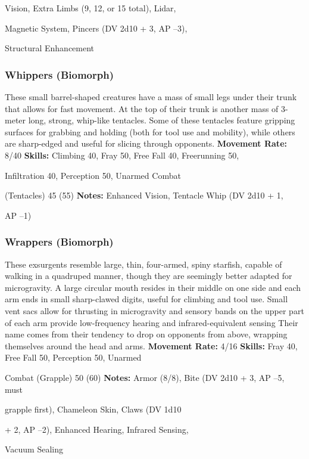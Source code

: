 Vision, Extra Limbs (9, 12, or 15 total), Lidar, 

Magnetic System, Pincers (DV 2d10 + 3, AP –3), 

Structural Enhancement 

\subsubsection{Whippers (Biomorph)}

These small barrel-shaped creatures have a mass 
of small legs under their trunk that allows for fast 
movement. At the top of their trunk is another mass 
of 3-meter long, strong, whip-like tentacles. Some 
of these tentacles feature gripping surfaces for grabbing
and holding (both for tool use and mobility),
while others are sharp-edged and useful for slicing 
through opponents. 
\textbf{Movement Rate:} 8/40
\textbf{Skills:} Climbing 40, Fray 50, Free Fall 40, Freerunning 50, 

Infiltration 40, Perception 50, Unarmed Combat 

(Tentacles) 45 (55)
\textbf{Notes: }Enhanced Vision, Tentacle Whip (DV 2d10 + 1, 

AP –1)

\subsubsection{Wrappers (Biomorph)}

These exsurgents resemble large, thin, four-armed, 
spiny starfish, capable of walking in a quadruped 
manner, though they are seemingly better adapted for 
microgravity. A large circular mouth resides in their 
middle on one side and each arm ends in small sharp-clawed
digits, useful for climbing and tool use. Small
vent sacs allow for thrusting in microgravity and 
sensory bands on the upper part of each arm provide 
low-frequency hearing and infrared-equivalent sensing
Their name comes from their tendency to drop on
opponents from above, wrapping themselves around 
the head and arms.
\textbf{Movement Rate:} 4/16
\textbf{Skills:} Fray 40, Free Fall 50, Perception 50, Unarmed 

Combat (Grapple) 50 (60) 
\textbf{Notes: }Armor (8/8), Bite (DV 2d10 + 3, AP –5, must 

grapple first), Chameleon Skin, Claws (DV 1d10 

+ 2, AP –2), Enhanced Hearing, Infrared Sensing, 

Vacuum Sealing

